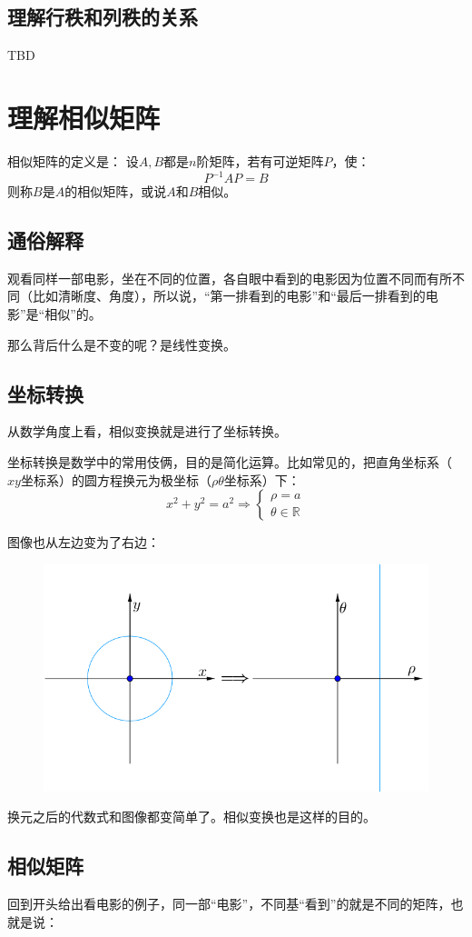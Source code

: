 \documentclass[12pt]{article}
\begin{document}
\subsection{理解行秩和列秩的关系\cite{Why_Rank_Of_Row_Column_Equal}}
TBD

\section{理解相似矩阵\cite{How_To_Understand_Similar_Matrix}}
相似矩阵的定义是：
设$A,B$都是$n$阶矩阵，若有可逆矩阵$P$，使：
$$
P^{-1}AP=B
$$
则称$B$是$A$的相似矩阵，或说$A$和$B$相似。

\subsection{通俗解释}
观看同样一部电影，坐在不同的位置，各自眼中看到的电影因为位置不同而有所不同（比如清晰度、角度），所以说，“第一排看到的电影”和“最后一排看到的电影”是“相似”的。

那么背后什么是不变的呢？是线性变换。

\subsection{坐标转换}
从数学角度上看，相似变换就是进行了坐标转换。

坐标转换是数学中的常用伎俩，目的是简化运算。比如常见的，把直角坐标系（$xy$坐标系）的圆方程换元为极坐标（$\rho\theta$坐标系）下：
$$
x^2 + y^2 = a^2 \Rightarrow \begin{cases}
\rho = a \\
\theta \in \mathbb{R}
\end{cases}
$$

图像也从左边变为了右边：
\begin{figure}[H]
    \centering
    \includegraphics[width=.5\textwidth]{fig/UnderstandSimilarMatrix_1.png}
\end{figure} 

换元之后的代数式和图像都变简单了。相似变换也是这样的目的。

\subsection{相似矩阵}
回到开头给出看电影的例子，同一部“电影”，不同基“看到”的就是不同的矩阵，也就是说：
\end{document}
